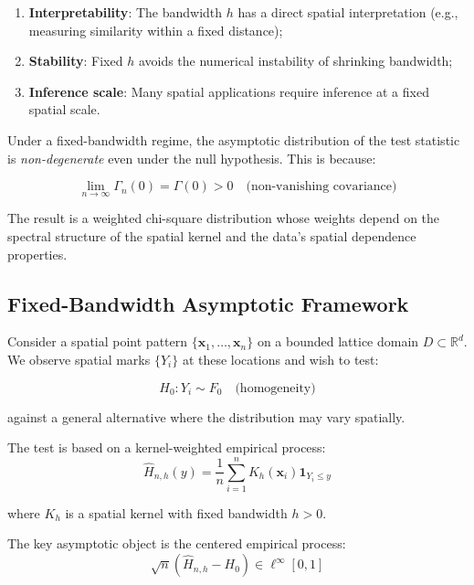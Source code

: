 \documentclass[12pt]{article}
\theoremstyle{plain}
\theoremstyle{definition}
\newcommand{\1}[1]{\mathbf{1}_{#1}}
\begin{document}
\begin{enumerate}
\item \textbf{Interpretability}: The bandwidth $h$ has a direct spatial interpretation (e.g., measuring similarity within a fixed distance);
\item \textbf{Stability}: Fixed $h$ avoids the numerical instability of shrinking bandwidth;
\item \textbf{Inference scale}: Many spatial applications require inference at a fixed spatial scale.
\end{enumerate}

Under a fixed-bandwidth regime, the asymptotic distribution of the test statistic is \emph{non-degenerate} even under the null hypothesis. This is because:

\begin{equation}
\lim_{n \to \infty} \Gamma_n(0) = \Gamma(0) > 0 \quad \text{(non-vanishing covariance)}
\end{equation}

The result is a weighted chi-square distribution whose weights depend on the spectral structure of the spatial kernel and the data's spatial dependence properties.

\subsection{Fixed-Bandwidth Asymptotic Framework}

Consider a spatial point pattern $\{\mathbf{x}_1, \ldots, \mathbf{x}_n\}$ on a bounded lattice domain $D \subset \mathbb{R}^d$. We observe spatial marks $\{Y_i\}$ at these locations and wish to test:

\begin{equation}
H_0: Y_i \sim F_0 \quad \text{(homogeneity)}
\end{equation}

against a general alternative where the distribution may vary spatially.

The test is based on a kernel-weighted empirical process:
\begin{equation}
\widehat{H}_{n,h}(y) = \frac{1}{n} \sum_{i=1}^n K_h(\mathbf{x}_i) \1{Y_i \le y}
\end{equation}

where $K_h$ is a spatial kernel with fixed bandwidth $h > 0$.

The key asymptotic object is the centered empirical process:
\begin{equation}
\sqrt{n} \left(\widehat{H}_{n,h} - H_0\right) \in \ell^\infty[0,1]
\end{equation}
\end{document}
